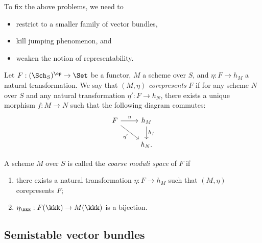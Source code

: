     To fix the above problems, we need to 
    \begin{itemize}
        \item restrict to a smaller family of vector bundles,
        \item kill jumping phenomenon, and
        \item weaken the notion of representability.
    \end{itemize}



    \begin{definition}\label{def:corepresents_functor}
        Let \(F: (\Sch_S)^{\op} \to \Set\) be a functor, \(M\) a scheme over \(S\), and \(\eta : F \to h_M\) a natural transformation.
        We say that \((M, \eta)\) \emph{corepresents} \(F\) 
        if for any scheme \(N\) over \(S\) and any natural transformation \(\eta' : F \to h_N\), 
        there exists a unique morphism \(f : M \to N\) such that the following diagram commutes:
        \[ \begin{tikzcd}
            F \arrow[r, "\eta"] \arrow[dr, "\eta'"'] & h_M \arrow[d, "h_f"] \\
             & h_N.
        \end{tikzcd} \]
    \end{definition}

    \begin{definition}\label{def:coarse_moduli_space}
        A scheme \(M\) over \(S\) is called the \emph{coarse moduli space} of \(F\) if 
        \begin{enumerate}
            \item there exists a natural transformation \(\eta : F \to h_M\) such that \((M, \eta)\) corepresents \(F\);
            \item \(\eta_\kkk : F(\kkk) \to M(\kkk)\) is a bijection.
        \end{enumerate}
    \end{definition}


\subsection{Semistable vector bundles}

